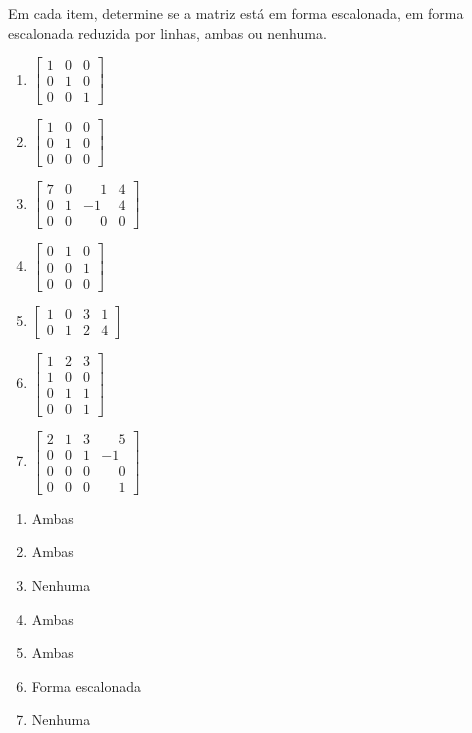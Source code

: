\documentclass[12pt]{exam}
\begin{document}
\begin{exercicio}
  Em cada item, determine se a matriz está em forma escalonada, em forma escalonada reduzida por linhas, ambas ou nenhuma.
  \begin{multicols}{3}
  \begin{enumerate}[label={\alph*})]
    \item $\begin{bmatrix}1 & 0 & 0\\0 & 1 & 0\\0 & 0 & 1\end{bmatrix}$
    \item $\begin{bmatrix}1 & 0 & 0\\0 & 1 & 0\\0 & 0 & 0\end{bmatrix}$
    \item $\begin{bmatrix}7 & 0 & \phantom{-} 1 & 4\\0 & 1 & -1 & 4\\0 & 0 & \phantom{-} 0 & 0\end{bmatrix}$
    \item $\begin{bmatrix}0 & 1 & 0\\0 & 0 & 1\\0 & 0 & 0\end{bmatrix}$
    \item $\begin{bmatrix}1 & 0 & 3 & 1\\0 & 1 & 2 & 4\end{bmatrix}$
    \item $\begin{bmatrix}1 & 2 & 3\\1 & 0 & 0\\0 & 1 & 1\\0 & 0 & 1\end{bmatrix}$
    \item $\begin{bmatrix}2 & 1 & 3 & \phantom{-} 5\\0 & 0 & 1 & -1\\0 & 0 & 0 & \phantom{-} 0\\0 & 0 & 0 & \phantom{-} 1\end{bmatrix}$
  \end{enumerate}
\end{multicols}

  \begin{solucao}
    \begin{enumerate}[label={\alph*})]
      \item Ambas
      \item Ambas
      \item Nenhuma
      \item Ambas
      \item Ambas
      \item Forma escalonada
      \item Nenhuma
    \end{enumerate}
  \end{solucao}
\end{exercicio}
\end{document}
